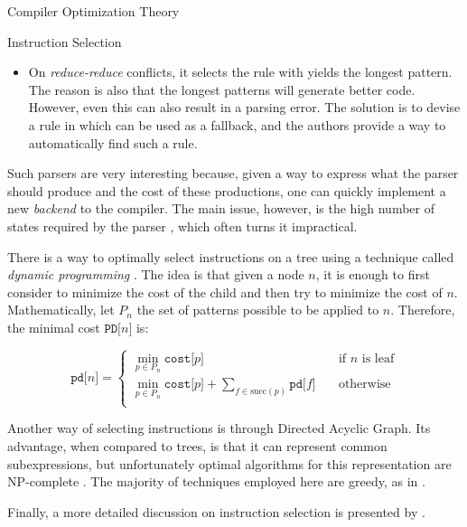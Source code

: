 \begin{section}{Compiler Optimization Theory}
\begin{subsection}{Instruction Selection}
\begin{itemize}
\item On \textit{reduce-reduce} conflicts, it selects the rule with yields the
longest pattern. The reason is also that the longest patterns will generate
better code. However, even this can also result in a parsing error. The
solution is to devise a rule in which can be used as a fallback, and the
authors provide a way to automatically find such a rule.

	\end{itemize}

Such parsers are very interesting because, given a way to express what the
parser should produce and the cost of these productions, one can quickly
implement a new \textit{backend} to the compiler.  The main issue, however, is
the high number of states required by the
parser \citep{blindell2016instruction}, which often turns it impractical.

There is a way to optimally select instructions on a tree using a technique
called \textit{dynamic programming} \citep{ripken1977formale}. The idea is that given a node $n$, it is enough to first consider to minimize the cost
of the child and then try to minimize the cost of $n$. Mathematically, let
$P_n$ the set of patterns possible to be applied to $n$. Therefore, the
minimal cost $\texttt{PD[}n\texttt{]}$ is:

\[
    \texttt{pd[}n\texttt{]} =
     \begin{cases}
       \min_{p \in P_n} \texttt{cost[}p\texttt{]}  &\quad\text{if } n \text{ is leaf}\\
       \min_{p \in P_n} \texttt{cost[}p\texttt{]} + \sum_{f \in \text{succ}(p)} \texttt{pd[}f\texttt{]} &\quad\text{otherwise}\\
     \end{cases}
\]

Another way of selecting instructions is through Directed Acyclic Graph. Its
advantage, when compared to trees, is that it can represent common
subexpressions, but unfortunately optimal algorithms for this representation
are NP-complete \citep{koes2008near}. The majority of techniques employed here
are greedy, as in \cite{llvm_insn_selection}.

Finally, a more detailed discussion on instruction selection is presented
by \cite{blindell2016instruction}.

\end{subsection}

\end{section}

